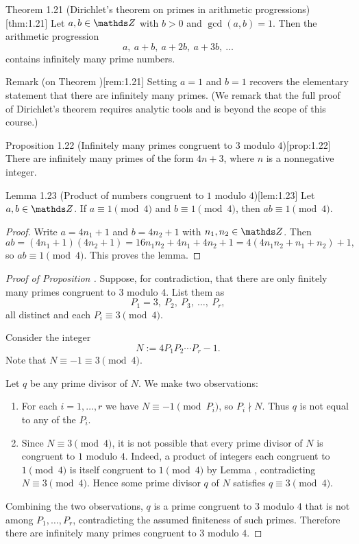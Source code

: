 \documentclass[10pt]{article}
\theoremstyle{definition}
\theoremstyle{plain}
\numberwithin{equation}{section}
\begin{document}
\begin{define}{Theorem 1.21 (Dirichlet's theorem on primes in arithmetic progressions)}[thm:1.21]
Let $a,b\in\setZ$ with $b>0$ and $\gcd(a,b)=1$. Then the arithmetic progression
\[
a,\ a+b,\ a+2b,\ a+3b,\ \ldots
\]
contains infinitely many prime numbers.
\end{define}

\begin{define}{Remark (on Theorem )}[rem:1.21]
Setting $a=1$ and $b=1$ recovers the elementary statement that there are infinitely many primes.
(We remark that the full proof of Dirichlet's theorem requires analytic tools and is beyond
the scope of this course.)
\end{define}

\begin{define}{Proposition 1.22 (Infinitely many primes congruent to $3$ modulo $4$)}[prop:1.22]
There are infinitely many primes of the form $4n+3$, where $n$ is a nonnegative integer.
\end{define}

\begin{define}{Lemma 1.23 (Product of numbers congruent to $1$ modulo $4$)}[lem:1.23]
Let $a,b\in\setZ$. If $a\equiv 1\pmod{4}$ and $b\equiv 1\pmod{4}$, then $ab\equiv 1\pmod{4}$.
\end{define}

\begin{proof}
Write $a=4n_1+1$ and $b=4n_2+1$ with $n_1,n_2\in\setZ$. Then
\[
ab=(4n_1+1)(4n_2+1)=16n_1n_2+4n_1+4n_2+1=4(4n_1n_2+n_1+n_2)+1,
\]
so $ab\equiv 1\pmod{4}$. This proves the lemma.
\end{proof}

\begin{proof}[Proof of Proposition ]
Suppose, for contradiction, that there are only finitely many primes congruent to $3$ modulo $4$.
List them as
\[
P_1=3,\ P_2,\ P_3,\ \dots,\ P_r,
\]
all distinct and each $P_i\equiv 3\pmod{4}$.

Consider the integer
\[
N := 4P_1P_2\cdots P_r - 1.
\]
Note that $N\equiv -1\equiv 3\pmod{4}$.

Let $q$ be any prime divisor of $N$. We make two observations:

\begin{enumerate}
  \item For each $i=1,\dots,r$ we have $N\equiv -1\pmod{P_i}$, so $P_i\nmid N$. Thus $q$ is not equal to any of the $P_i$.
  \item Since $N\equiv 3\pmod{4}$, it is not possible that every prime divisor of $N$ is congruent to $1$ modulo $4$. 
  Indeed, a product of integers each congruent to $1\pmod{4}$ is itself congruent to $1\pmod{4}$ by Lemma , 
  contradicting $N\equiv 3\pmod{4}$. Hence some prime divisor $q$ of $N$ satisfies $q\equiv 3\pmod{4}$.
\end{enumerate}

Combining the two observations, $q$ is a prime congruent to $3$ modulo $4$ that is not among $P_1,\dots,P_r$, contradicting 
the assumed finiteness of such primes. Therefore there are infinitely many primes congruent to $3$ modulo $4$.
\end{proof}
\end{document}
